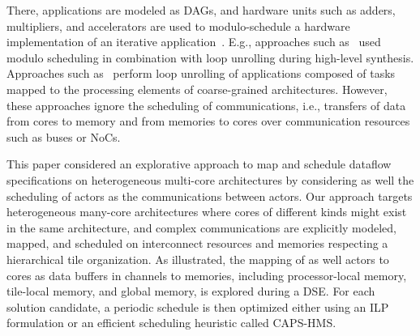 There, applications are modeled as \acp{DAG}, and hardware units such as adders, multipliers, and  accelerators are used to modulo-schedule a hardware implementation of an iterative application~\cite{teich1996synthesis}.
E.g., approaches such as~\cite{Oppermann:2016,Oppermann:2019} used modulo scheduling in combination with loop unrolling during high-level synthesis.
Approaches such as~\cite{Witterauf:2016,tirelli2023sat} perform loop unrolling of applications composed of tasks mapped to the processing elements of coarse-grained architectures.
However, these approaches ignore the scheduling of communications, i.e., transfers of data from cores to memory and from memories to cores over communication resources such as buses or \acp{NoC}.
\par
This paper considered an explorative approach to map and schedule dataflow specifications on heterogeneous multi-core architectures by considering as well the scheduling of actors as the communications between actors.
Our approach targets heterogeneous many-core architectures where cores of different kinds might exist in the same architecture, and complex communications are explicitly modeled, mapped, and scheduled on interconnect resources and memories respecting a hierarchical tile organization.
As illustrated, the mapping of as well actors to cores as data buffers in channels to memories, including processor-local memory, tile-local memory, and global memory, is explored during a \ac{DSE}.
For each solution candidate, a periodic schedule is then optimized either using an ILP formulation or an efficient scheduling heuristic called \ac{CAPS-HMS}.
